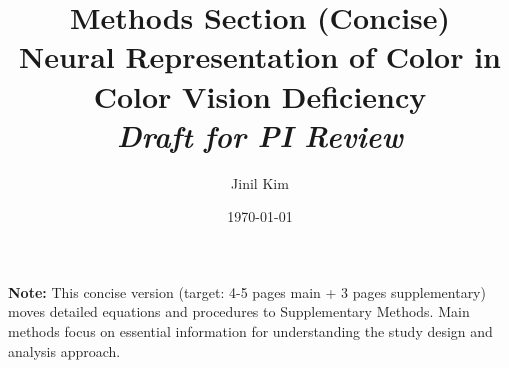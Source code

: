 \documentclass[11pt, a4paper]{article}
\title{\textbf{Methods Section (Concise)}\\[0.5em]
\large Neural Representation of Color in Color Vision Deficiency\\[0.5em]
\normalsize \textit{Draft for PI Review}}
\author{Jinil Kim}
\date{\today}
\begin{document}
\maketitle

\vspace{1em}
\noindent\textbf{Note:} This concise version (target: 4-5 pages main + 3 pages supplementary) moves detailed equations and procedures to Supplementary Methods. Main methods focus on essential information for understanding the study design and analysis approach.

\vspace{2em}



\clearpage
\printbibliography
\end{document}
